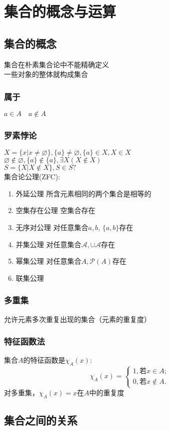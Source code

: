 \documentclass{book}
\newcommand{\E}{\exists}
\newcommand{\no}{\varnothing}
\newcommand{\scr}[1]{\mathscr{#1}}
\begin{document}
\else
\chapter{集合的概念与运算}
\fi
\section{集合的概念}
\noindent
集合在朴素集合论中不能精确定义\\
一些对象的整体就构成集合\\
\subsection{属于}
$a\in A\quad a\notin A$\\
\subsection{罗素悖论}
\noindent
$X=\{x|x\ne \no\}, \{a\}\ne\no, \{a\}\in X, X\in X$\\
$\no\notin\no, \{a\}\notin \{a\}, \E X(X\notin X)$\\
$S=\{X|X\notin X\}, S\in S?$\\
集合论公理(ZFC):
\begin{enumerate}
    \item{外延公理} 所含元素相同的两个集合是相等的
    \item{空集存在公理} 空集合存在
    \item{无序对公理} 对任意集合$a,b$, $\{a,b\}$存在
    \item{并集公理} 对任意集合$\scr{A}, \cup \scr{A}$存在
    \item{幂集公理} 对任意集合$A, \scr{P}(A)$存在
    \item{联集公理}
\end{enumerate}
\subsection{多重集}
允许元素多次重复出现的集合（元素的重复度）
\subsection{特征函数法}
集合$A$的特征函数是$\chi_A(x)$:
$$
\chi_A(x)=
    \begin{cases}
        1, \mbox{若}x\in A;\\
        0, \mbox{若}x\notin A.
    \end{cases}
$$
对多重集，$\chi_A(x)=x$在$A$中的重复度
\section{集合之间的关系}
\end{document}
